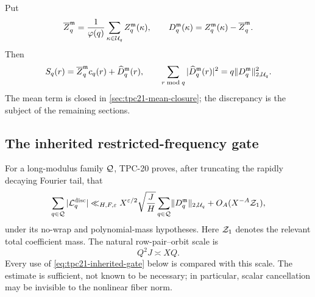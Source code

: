 Put
\begin{equation}
 \overline Z_q^{\mathfrak m}
 =\frac1{\varphi(q)}\sum_{\kappa\in\mathcal U_q}
 Z_q^{\mathfrak m}(\kappa),
 \qquad
 D_q^{\mathfrak m}(\kappa)
 =Z_q^{\mathfrak m}(\kappa)-\overline Z_q^{\mathfrak m}.
 \label{eq:tpc21-mean-discrepancy}
\end{equation}
Then
\begin{equation}
 S_q(r)=\overline Z_q^{\mathfrak m}c_q(r)
 +\widehat D_q^{\mathfrak m}(r),
 \qquad
 \sum_{r\bmod q}|\widehat D_q^{\mathfrak m}(r)|^2
 =q\lVert D_q^{\mathfrak m}\rVert_{2,\mathcal U_q}^2.
 \label{eq:tpc21-additive-parseval}
\end{equation}
The mean term is closed in \cref{sec:tpc21-mean-closure}; the discrepancy is
the subject of the remaining sections.

\subsection{The inherited restricted-frequency gate}

For a long-modulus family \(\mathcal Q\), TPC-20 proves, after truncating the
rapidly decaying Fourier tail, that
\begin{equation}
 \sum_{q\in\mathcal Q}|\mathcal L_q^{\rm disc}|
 \ll_{H,F,\varepsilon}X^{\varepsilon/2}\sqrt{\frac JH}
 \sum_{q\in\mathcal Q}\lVert D_q^{\mathfrak m}\rVert_{2,\mathcal U_q}
 +O_A(X^{-A}\mathcal Z_1),
 \label{eq:tpc21-inherited-gate}
\end{equation}
under its no-wrap and polynomial-mass hypotheses.  Here
\(\mathcal Z_1\) denotes the relevant total coefficient mass.  The natural
row-pair--orbit scale is
\begin{equation}
 Q^2J\asymp XQ.
 \label{eq:tpc21-natural-scale}
\end{equation}
Every use of \eqref{eq:tpc21-inherited-gate} below is compared with
this scale.  The estimate is sufficient, not known to be necessary;
in particular, scalar cancellation may be invisible to the nonlinear
fiber norm.
